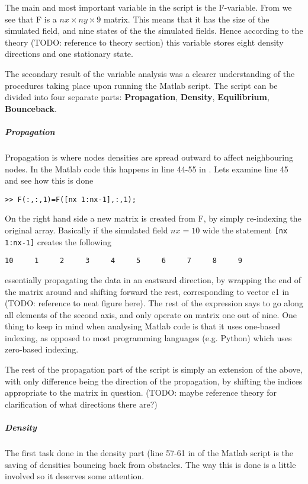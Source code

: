 The main and most important variable in the script is the F-variable. From  we see that F is a $nx\times ny\times 9$ matrix. This means that it has the size of the simulated field, and nine states of the the simulated fields. Hence according to the theory (TODO: reference to theory section) this variable stores eight density directions and one stationary state. 

The secondary result of the variable analysis was a clearer understanding of the procedures taking place upon running the Matlab script. The script can be divided into four separate parts: \textbf{Propagation}, \textbf{Density}, \textbf{Equilibrium}, \textbf{Bounceback}.

\subparagraph{Propagation} 
Propagation is where nodes densities are spread outward to affect neighbouring nodes. In the Matlab code this happens in line 44-55 in . Lets examine line 45 and see how this is done

\begin{verbatim}
>> F(:,:,1)=F([nx 1:nx-1],:,1);
\end{verbatim}

On the right hand side a new matrix is created from F, by simply re-indexing the original array. Basically if the simulated field $nx=10$ wide the statement \texttt{[nx 1:nx-1]} creates the following

\begin{verbatim}
10     1     2     3     4     5     6     7     8     9
\end{verbatim}

essentially propagating the data in an eastward direction, by wrapping the end of the matrix around and shifting forward the rest, corresponding to vector c1 in (TODO: reference to neat figure here). The rest of the expression says to go along all elements of the second axis, and only operate on matrix one out of nine. One thing to keep in mind when analysing Matlab code is that it uses one-based indexing, as opposed to most programming languages (e.g. Python) which uses zero-based indexing.

The rest of the propagation part of the script is simply an extension of the above, with only difference being the direction of the propagation, by shifting the indices appropriate to the matrix in question. (TODO: maybe reference theory for clarification of what directions there are?)

\subparagraph*{Density}
The first task done in the density part (line 57-61 in  of the Matlab script is the saving of densities bouncing back from obstacles. The way this is done is a little involved so it deserves some attention.


